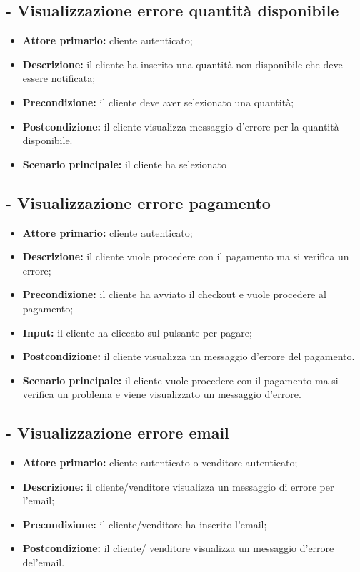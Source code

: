 \stepUserCase
\subsection{ - Visualizzazione errore quantità disponibile}
\begin{itemize}
    \item \textbf{Attore primario:} cliente autenticato;
    \item \textbf{Descrizione:} il cliente ha inserito una quantità non disponibile che deve essere notificata;
    \item \textbf{Precondizione:} il cliente deve aver selezionato una quantità;
    \item \textbf{Postcondizione:} il cliente visualizza messaggio d'errore per la quantità disponibile.
    \item \textbf{Scenario principale:} il cliente ha selezionato 
\end{itemize}

\stepUserCase
\subsection{ - Visualizzazione errore pagamento}
\begin{itemize}
    \item \textbf{Attore primario:} cliente autenticato;
    \item \textbf{Descrizione:} il cliente vuole procedere con il pagamento ma si verifica un errore;
    \item \textbf{Precondizione:} il cliente ha avviato il checkout e vuole procedere al pagamento;
    \item \textbf{Input:} il cliente ha cliccato sul pulsante per pagare;
    \item \textbf{Postcondizione:} il cliente visualizza un messaggio d'errore del pagamento.
    \item \textbf{Scenario principale:} il cliente vuole procedere con il pagamento ma si verifica un problema e viene visualizzato un messaggio d'errore.
\end{itemize}

\stepUserCase
\subsection{ - Visualizzazione errore email}
\begin{itemize}
    \item \textbf{Attore primario:} cliente autenticato o venditore autenticato;
    \item \textbf{Descrizione:} il cliente/venditore visualizza un messaggio di errore per l'email;
    \item \textbf{Precondizione:} il cliente/venditore ha inserito l'email;
    \item \textbf{Postcondizione:} il cliente/ venditore visualizza un messaggio d'errore del'email. 
\end{itemize}

